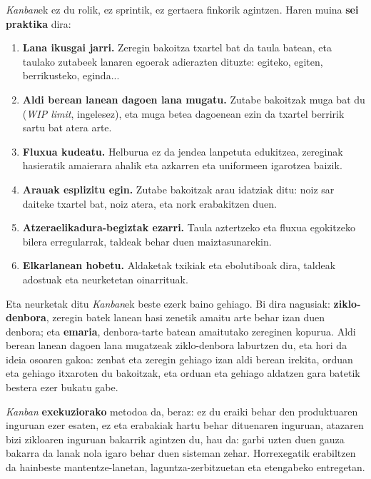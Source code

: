 \textit{Kanban}ek ez du rolik, ez sprintik, ez gertaera finkorik agintzen.
Haren muina \textbf{sei praktika} dira:

\begin{enumerate}
    \item \textbf{Lana ikusgai jarri.} Zeregin bakoitza txartel bat da taula batean, eta taulako zutabeek lanaren egoerak adierazten dituzte: egiteko, egiten, berrikusteko, eginda...
    \vspace{0.15cm}
    \item \textbf{Aldi berean lanean dagoen lana mugatu.} Zutabe bakoitzak muga bat du (\textit{WIP limit}, ingelesez), eta muga betea dagoenean ezin da txartel berririk sartu bat atera arte.
    \vspace{0.15cm}
    \item \textbf{Fluxua kudeatu.} Helburua ez da jendea lanpetuta edukitzea, zereginak hasieratik amaierara ahalik eta azkarren eta uniformeen igarotzea baizik.
    \vspace{0.15cm}
    \item \textbf{Arauak esplizitu egin.} Zutabe bakoitzak arau idatziak ditu: noiz sar daiteke txartel bat, noiz atera, eta nork erabakitzen duen.
    \vspace{0.15cm}
    \item \textbf{Atzeraelikadura-begiztak ezarri.} Taula aztertzeko eta fluxua egokitzeko bilera erregularrak, taldeak behar duen maiztasunarekin.
    \vspace{0.15cm}
    \item \textbf{Elkarlanean hobetu.} Aldaketak txikiak eta ebolutiboak dira, taldeak adostuak eta neurketetan oinarrituak.
\end{enumerate}

Eta neurketak ditu \textit{Kanban}ek beste ezerk baino gehiago.
Bi dira nagusiak: \textbf{ziklo-denbora}, zeregin batek lanean hasi zenetik amaitu arte behar izan duen denbora; eta \textbf{emaria}, denbora-tarte batean amaitutako zereginen kopurua.
Aldi berean lanean dagoen lana mugatzeak ziklo-denbora laburtzen du, eta hori da ideia osoaren gakoa: zenbat eta zeregin gehiago izan aldi berean irekita, orduan eta gehiago itxaroten du bakoitzak, eta orduan eta gehiago aldatzen gara batetik bestera ezer bukatu gabe.

\textit{Kanban} \textbf{exekuziorako} metodoa da, beraz: ez du eraiki behar den produktuaren inguruan ezer esaten, ez eta erabakiak hartu behar dituenaren inguruan, atazaren bizi zikloaren inguruan bakarrik agintzen du, hau da: garbi uzten duen gauza bakarra da lanak nola igaro behar duen sisteman zehar.
Horrexegatik erabiltzen da hainbeste mantentze-lanetan, laguntza-zerbitzuetan eta etengabeko entregetan.

